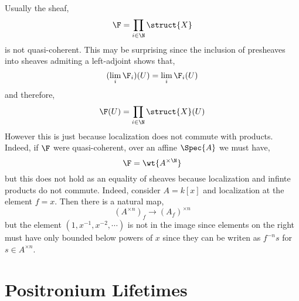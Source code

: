 \documentclass[12pt]{article}
\begin{document}
Usually the sheaf,
\[ \F = \prod_{i \in \N} \struct{X} \]
is not quasi-coherent. This may be surprising since the inclusion of presheaves into sheaves admiting a left-adjoint shows that,
\[ (\lim_i \F_i)(U) = \lim_i \F_i(U) \]
and therefore,
\[ \F(U) = \prod_{i \in \N} \struct{X}(U) \]
However this is just because localization does not commute with products. Indeed, if $\F$ were quasi-coherent, over an affine $\Spec{A}$ we must have,
\[ \F = \wt{A^{\times \N}} \]
but this does not hold as an equality of sheaves because localization and infinte products do not commute. Indeed, consider $A = k[x]$ and localization at the element $f = x$. Then there is a natural map,
\[ (A^{\times n})_f \to (A_f)^{\times n} \]
but the element $(1, x^{-1}, x^{-2}, \cdots)$ is not in the image since elements on the right must have only bounded below powers of $x$ since they can be writen as $f^{-n} s$ for $s \in A^{\times n}$. 

\section{Positronium Lifetimes}

\newcommand{\CM}{\mathrm{CM}}
\end{document}
